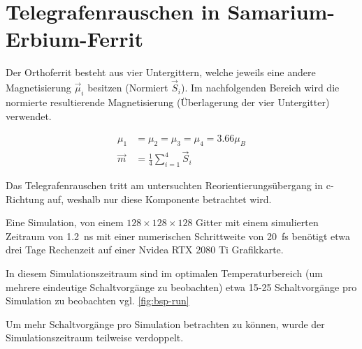 \documentclass[main.tex]{subfiles}
\begin{document}
\newpage
\section{Telegrafenrauschen in Samarium-Erbium-Ferrit}

Der Orthoferrit besteht aus vier Untergittern, welche jeweils eine andere Magnetisierung \(\vec{\mu}_i\) besitzen (Normiert \(\vec{S}_i\)). Im nachfolgenden Bereich wird die normierte resultierende Magnetisierung (Überlagerung der vier Untergitter) verwendet.

\begin{align}
    \mu_{1} &=  \mu_{2} = \mu_{3} = \mu_{4} = \num{3.66}\mu_B \\
    \vec{m} &= \frac{1}{4} \sum_{i=1}^4 \vec{S}_i
\end{align}

Das Telegrafenrauschen tritt am untersuchten Reorientierungsübergang in c-Richtung auf, weshalb nur diese Komponente betrachtet wird. 


Eine Simulation, von einem \(128 \times 128 \times 128\) Gitter mit einem simulierten Zeitraum von \SI{1.2}{\nano\second} mit einer numerischen Schrittweite von \SI{20}{\femto\second} benötigt etwa drei Tage Rechenzeit auf einer Nvidea RTX 2080 Ti Grafikkarte. 

In diesem Simulationszeitraum sind im optimalen Temperaturbereich (um mehrere eindeutige Schaltvorgänge zu beobachten) etwa 15-25 Schaltvorgänge pro Simulation zu beobachten vgl. \cref{fig:bsp-run}

Um mehr Schaltvorgänge pro Simulation betrachten zu können, wurde der Simulationszeitraum teilweise verdoppelt.
\end{document}
